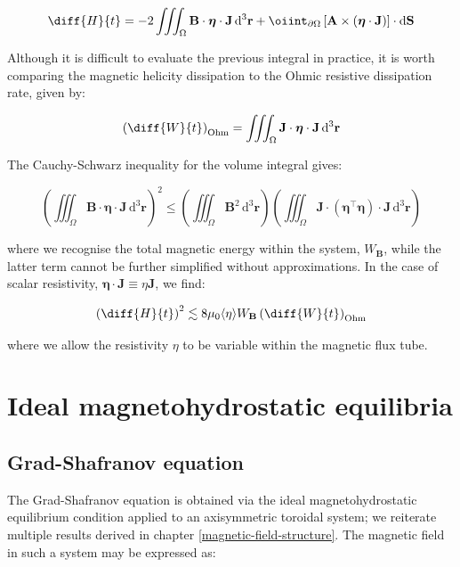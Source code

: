 \begin{equation}
    \diff{H}{t}=-2\iiint_{\Omega}\mathbf{B}\cdot\boldsymbol{\eta}\cdot\mathbf{J}\,\mathrm{d}^3\mathbf{r}+\oiint_{\partial\Omega}\left[\mathbf{A}\times(\boldsymbol{\eta}\cdot\mathbf{J})\right]\cdot\mathrm{d}\mathbf{S}
\end{equation}

Although it is difficult to evaluate the previous integral in practice, it is worth comparing the magnetic helicity dissipation to the Ohmic resistive dissipation rate, given by:

\begin{equation}
    \left(\diff{W}{t}\right)_\text{Ohm}=\iiint_{\Omega}\mathbf{J}\cdot\boldsymbol{\eta}\cdot\mathbf{J}\,\mathrm{d}^3\mathbf{r}
\end{equation}

The Cauchy-Schwarz inequality for the volume integral gives:

\begin{equation}
    \left(\iiint_{\Omega}\mathbf{B}\cdot\boldsymbol{\eta}\cdot\mathbf{J}\,\mathrm{d}^3\mathbf{r}\right)^2\leq\left(\iiint_{\Omega}\mathbf{B}^2\,\mathrm{d}^3\mathbf{r}\right)\left(\iiint_{\Omega}\mathbf{J}\cdot(\boldsymbol{\eta}^\top\boldsymbol{\eta})\cdot\mathbf{J}\,\mathrm{d}^3\mathbf{r}\right)
\end{equation}

where we recognise the total magnetic energy within the system, $W_\mathbf{B}$, while the latter term cannot be further simplified without approximations. In the case of scalar resistivity, $\boldsymbol{\eta}\cdot\mathbf{J}\equiv\eta\mathbf{J}$, we find:

\begin{equation}
    \left(\diff{H}{t}\right)^2\lesssim8\mu_0\langle\eta\rangle W_\mathbf{B}\left(\diff{W}{t}\right)_\text{Ohm}
\end{equation}

where we allow the resistivity $\eta$ to be variable within the magnetic flux tube.

\section{Ideal magnetohydrostatic equilibria}

\subsection{Grad-Shafranov equation}

The Grad-Shafranov equation is obtained via the ideal magnetohydrostatic equilibrium condition applied to an axisymmetric toroidal system; we reiterate multiple results derived in chapter \ref{magnetic-field-structure}. The magnetic field in such a system may be expressed as:

